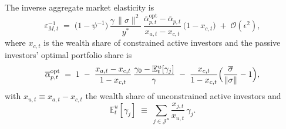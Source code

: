 \begin{prop}\label{prop_elasticity_pref_heterog}
The inverse aggregate market elasticity is
\begin{equation}\label{eq:elasticity_pref_heterog}
    \varepsilon_{M,t}^{-1}
    \;=\;
    \bigl(1-\psi^{-1}\bigr)\,
    \frac{\gamma\,\|\sigma\|^{2}}{y^*}\,
    \frac{\overline{\alpha}_{p,t}^{\mathrm{opt}}-\overline{\alpha}_{p,t}}{x_{a,t}-x_{c,t}}\,
    \bigl(1-x_{c,t}\bigr)
    \;+\;\mathcal{O}\!\left(\epsilon^{2}\right),
\end{equation}
where $x_{c,t}$ is the wealth share of constrained active investors and the passive investors’ optimal portfolio share is
\begin{equation}\label{eq:optimal_alpha_p}
    \overline{\alpha}_{p,t}^{\mathrm{opt}}
    \;=\;
    1
    \;-\;
    \frac{x_{a,t}-x_{c,t}}{1-x_{c,t}}\,
    \frac{\gamma_{0}-\mathbb{E}^{u}_{t}[\gamma_{j}]}{\gamma}
    \;-\;
    \frac{x_{c,t}}{1-x_{c,t}}
    \Bigl(\frac{\overline{\sigma}}{\|\sigma\|}-1\Bigr),
\end{equation}
with $x_{u,t}\equiv x_{a,t}-x_{c,t}$ the wealth share of unconstrained active investors and 
\[
    \mathbb{E}^{u}_{t}[\gamma_{j}]
    \;\equiv\;
    \sum_{j\in\mathcal{J}^{u}}\frac{x_{j,t}}{x_{u,t}}\,\gamma_{j}.
\]
\end{prop}



